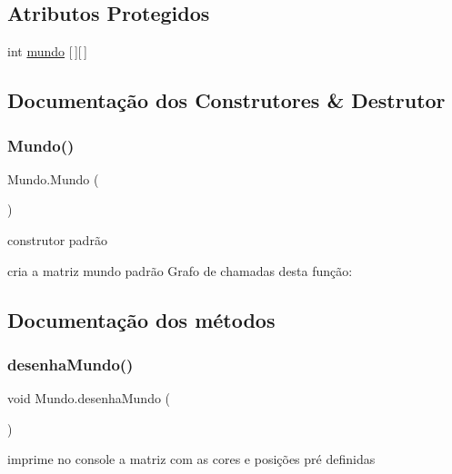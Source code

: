 \subsection*{Atributos Protegidos}
\begin{DoxyCompactItemize}
\item 
int \mbox{\hyperlink{class_mundo_a689dcc4a20afc97fc8a63907ab682d7e}{mundo}} \mbox{[}$\,$\mbox{]}\mbox{[}$\,$\mbox{]}
\end{DoxyCompactItemize}


\subsection{Documentação dos Construtores \& Destrutor}
\mbox{\label{class_mundo_ae3801a0a633ad3475456c67639561105}} 
\subsubsection{\texorpdfstring{Mundo()}{Mundo()}}
{\footnotesize\ttfamily Mundo.\+Mundo (\begin{DoxyParamCaption}{ }\end{DoxyParamCaption})}



construtor padrão 

cria a matriz mundo padrão Grafo de chamadas desta função\+:


\subsection{Documentação dos métodos}
\mbox{\label{class_mundo_adbafcb32f5f209eda97e1c7953c6e599}} 
\subsubsection{\texorpdfstring{desenha\+Mundo()}{desenhaMundo()}}
{\footnotesize\ttfamily void Mundo.\+desenha\+Mundo (\begin{DoxyParamCaption}{ }\end{DoxyParamCaption})}



imprime no console a matriz com as cores e posições pré definidas 

